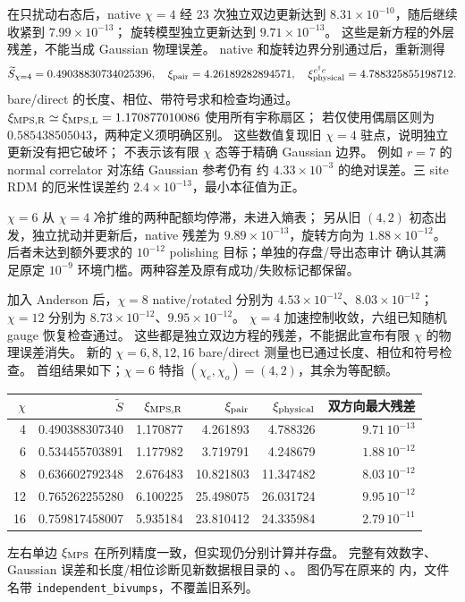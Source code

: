 在只扰动右态后，native $\chi=4$ 经 23 次独立双边更新达到
$8.31\times10^{-10}$，随后继续收紧到 $7.99\times10^{-13}$；
旋转模型独立更新达到 $9.71\times10^{-13}$。
这些是新方程的外层残差，不能当成 Gaussian 物理误差。
native 和旋转边界分别通过后，重新测得
\[
 \widetilde S_{\chi=4}=0.49038830734025396,\quad
 \xi_{\rm pair}=4.26189282894571,\quad
 \xi_{\rm physical}^{c^\dagger c}=4.788325855198712.
\]
bare/direct 的长度、相位、带符号求和检查均通过。
$\xi_{\rm MPS,R}\simeq\xi_{\rm MPS,L}=1.170877010086$ 使用所有宇称扇区；
若仅使用偶扇区则为 $0.585438505043$，两种定义须明确区别。
这些数值复现旧 $\chi=4$ 驻点，说明独立更新没有把它破坏；
不表示该有限 $\chi$ 态等于精确 Gaussian 边界。
例如 $r=7$ 的 normal correlator 对冻结 Gaussian 参考仍有
约 $4.33\times10^{-3}$ 的绝对误差。三 site RDM 的厄米性误差约
$2.4\times10^{-13}$，最小本征值为正。

$\chi=6$ 从 $\chi=4$ 冷扩维的两种配额均停滞，未进入熵表；
另从旧 $(4,2)$ 初态出发，独立扰动并更新后，native 残差为
$9.89\times10^{-13}$，旋转方向为 $1.88\times10^{-12}$。
后者未达到额外要求的 $10^{-12}$ polishing 目标；单独的存盘/导出态审计
确认其满足原定 $10^{-9}$ 环境门槛。两种容差及原有成功/失败标记都保留。

加入 Anderson 后，$\chi=8$ native/rotated 分别为
$4.53\times10^{-12}$、$8.03\times10^{-12}$；
$\chi=12$ 分别为 $8.73\times10^{-12}$、$9.95\times10^{-12}$。
$\chi=4$ 加速控制收敛，六组已知随机 gauge 恢复检查通过。
这些都是独立双边方程的残差，不能据此宣布有限 $\chi$ 的物理误差消失。
新的 $\chi=6,8,12,16$ bare/direct 测量也已通过长度、相位和符号检查。
首组结果如下；$\chi=6$ 特指 $(\chi_e,\chi_o)=(4,2)$，其余为等配额。
\begin{center}
\small
\begin{tabular}{rrrrrr}
\toprule
$\chi$ & $\widetilde S$ & $\xi_{\rm MPS,R}$ & $\xi_{\rm pair}$ &
$\xi_{\rm physical}$ & 双方向最大残差\\
\midrule
4 & 0.490388307340 & 1.170877 & 4.261893 & 4.788326 & $9.71\,10^{-13}$\\
6 & 0.534455703891 & 1.177982 & 3.719791 & 4.248679 & $1.88\,10^{-12}$\\
8 & 0.636602792348 & 2.676483 & 10.821803 & 11.347482 & $8.03\,10^{-12}$\\
12 & 0.765262255280 & 6.100225 & 25.498075 & 26.031724 & $9.95\,10^{-12}$\\
16 & 0.759817458007 & 5.935184 & 23.810412 & 24.335984 & $2.79\,10^{-11}$\\
\bottomrule
\end{tabular}
\end{center}
左右单边 $\xi_{\rm MPS}$ 在所列精度一致，但实现仍分别计算并存盘。
完整有效数字、Gaussian 误差和长度/相位诊断见新数据根目录的
、。
图仍写在原来的  内，文件名带
\texttt{independent\_bivumps}，不覆盖旧系列。

